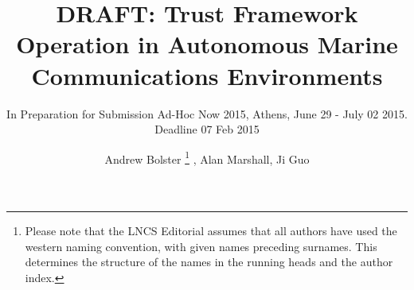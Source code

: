 \documentclass[runningheads,a4paper]{llncs}
\begin{document}
\mainmatter  %

\title{DRAFT: Trust Framework Operation in Autonomous Marine Communications Environments}
\subtitle{In Preparation for Submission Ad-Hoc Now 2015, Athens, June 29 - July 02 2015. Deadline 07 Feb 2015}


%
%
\author{Andrew Bolster%
\thanks{Please note that the LNCS Editorial assumes that all authors have used
the western naming convention, with given names preceding surnames. This determines
the structure of the names in the running heads and the author index.}
, Alan Marshall, Ji Guo}
%


\maketitle
\tableofcontents                                                 %

\end{document}
